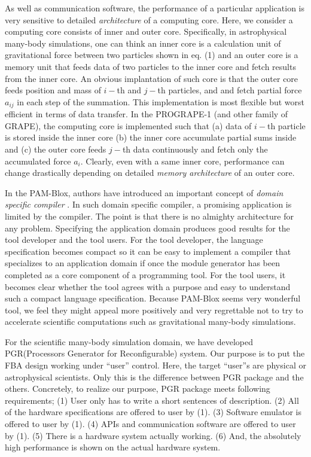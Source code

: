 \documentclass{llncs}
\begin{document}
As well as communication software, 
the performance of a particular application
is very sensitive to detailed {\it architecture} of a computing core.
Here, we consider a computing core consists of inner and outer core.
Specifically, in astrophysical many-body simulations,
one can think an inner core is a calculation unit of gravitational force between two particles
shown in eq. (1) and an outer core is a memory unit that feeds data of two particles 
to the inner core and fetch results from the inner core. 
An obvious implantation of such core is that the outer core
feeds position and mass of $i-$th and $j-$th particles, and
and fetch partial force $a_{ij}$ in each step of the summation.
This implementation is most flexible but worst efficient in terms of data transfer.
In the PROGRAPE-1 (and other family of GRAPE\cite{MT98}),
the computing core is implemented such that
(a) data of $i-$th particle is stored inside the inner core
(b) the inner core accumulate partial sums inside
and (c) the outer core feeds $j-$th data continuously and 
fetch only the accumulated force $a_{i}$.
Clearly, even with a same inner core, performance 
can change drastically depending on detailed {\it memory architecture} of an outer core.

In the PAM-Blox\cite{MMF97}, authors have introduced an important concept
of {\it domain specific compiler} \cite{MPMF01}. 
In such domain specific compiler, a promising application is limited by the
compiler. The point is that there is no almighty architecture for any problem.
Specifying the application domain produces good results for
the tool developer and the tool users.  For the tool developer, the
language specification becomes compact so it can be easy to implement
a compiler that specializes to an application domain if once the
module generator has been completed as a core component of a
programming tool.  For the tool users, it becomes clear whether the
tool agrees with a purpose and easy to understand such a compact
language specification.
Because PAM-Blox seems very wonderful tool, we feel they might appeal
more positively and very regrettable not to try to accelerate 
scientific computations such as gravitational many-body simulations.

For the scientific many-body simulation domain, we have developed
PGR(Processors Generator for Reconfigurable) system. 
Our purpose is to put the FBA design working under ``user'' control.
Here, the target ``user''s are physical or astrophysical scientists.
Only this is the difference between PGR package and the others.
Concretely, to realize our purpose, PGR package meets following requirements;
(1) User only has to write a short sentences of description.
(2) All of the hardware specifications are offered to user by (1).
(3) Software emulator is offered to user by (1).
(4) APIs and  communication software are offered to user by (1).
(5) There is a hardware system actually working.
(6) And, the absolutely high performance is shown on the actual hardware system.
\end{document}
